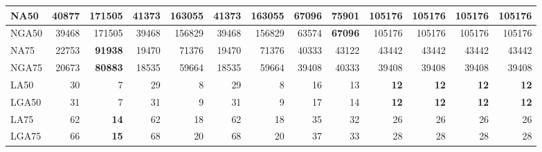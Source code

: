 \documentclass[12pt,a4paper]{article}
\begin{document}
\begin{table}[ht]
\begin{center}
\begin{tabular}{|l*{12}{|r}|}
NA50 & 40877 & 171505 & 41373 & 163055 & 41373 & 163055 & 67096 & {\bf 75901} & 105176 & 105176 & 105176 & 105176 \\ \hline
NGA50 & 39468 & 171505 & 39468 & 156829 & 39468 & 156829 & 63574 & {\bf 67096} & 105176 & 105176 & 105176 & 105176 \\ \hline
NA75 & 22753 & {\bf 91938} & 19470 & 71376 & 19470 & 71376 & 40333 & 43122 & 43442 & 43442 & 43442 & 43442 \\ \hline
NGA75 & 20673 & {\bf 80883} & 18535 & 59664 & 18535 & 59664 & 39408 & 40333 & 39408 & 39408 & 39408 & 39408 \\ \hline
LA50 & 30 & 7 & 29 & 8 & 29 & 8 & 16 & 13 & {\bf 12} & {\bf 12} & {\bf 12} & {\bf 12} \\ \hline
LGA50 & 31 & 7 & 31 & 9 & 31 & 9 & 17 & 14 & {\bf 12} & {\bf 12} & {\bf 12} & {\bf 12} \\ \hline
LA75 & 62 & {\bf 14} & 62 & 18 & 62 & 18 & 35 & 32 & 26 & 26 & 26 & 26 \\ \hline
LGA75 & 66 & {\bf 15} & 68 & 20 & 68 & 20 & 37 & 33 & 28 & 28 & 28 & 28 \\ \hline
\end{tabular}
\end{center}
\end{table}
\end{document}
